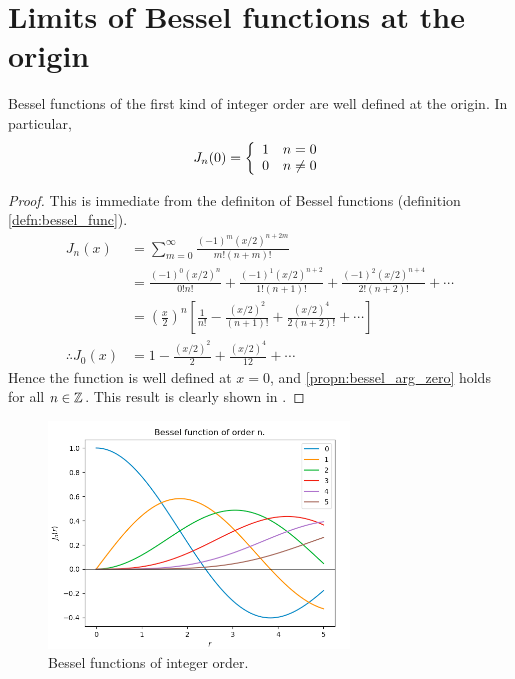 \section{Limits of Bessel functions at the origin}\label{ss:limits_of_bessel_functions}

\begin{propn}\label{propn:bessel_at_origin}
  Bessel functions of the first kind of integer order are well defined at the origin. In particular,
  \begin{align}\label{propn:bessel_arg_zero}
      J_n(0) =\left\{
        \begin{array}{c l}
             1 & n = 0 \\
             0 & n \neq 0
        \end{array}\right.
  \end{align}
\end{propn}
\begin{proof}
  This is immediate from the definiton of Bessel functions (definition \ref{defn:bessel_func}).
    \begin{align*}
      J_n(x)
        &= \sum^\infty_{m=0} \frac{(-1)^m(x/2)^{n+2m}}{m! (n+m)!}\\
        &= \frac{(-1)^0(x/2)^{n}}{0!n!}         %
          + \frac{(-1)^1(x/2)^{n+2}}{1!(n+1)!}  %
          + \frac{(-1)^2(x/2)^{n+4}}{2!(n+2)!}  %
          + \dotsb \\
        &= \left(\frac{x}{2}\right)^n
          \left[\frac{1}{n!}           %
          - \frac{(x/2)^{2}}{(n+1)!}   %
          + \frac{(x/2)^{4}}{2(n+2)!}  %
          + \dotsb \right]\\
      \therefore
      J_0(x)
        &= 1
          - \frac{(x/2)^{2}}{2}
          + \frac{(x/2)^{4}}{12} + \dotsb
    \end{align*}
  Hence the function is well defined at $x=0$, and \eqref{propn:bessel_arg_zero} holds for all $n \in \mathbb{Z}$. This result is clearly shown in .
\end{proof}

\begin{figure} \centering
  \includegraphics[width=8cm]{../figures/plot_bessel_int_order}
  \caption{Bessel functions of integer order.}\label{fig:bessel_int_problem}
\end{figure}

